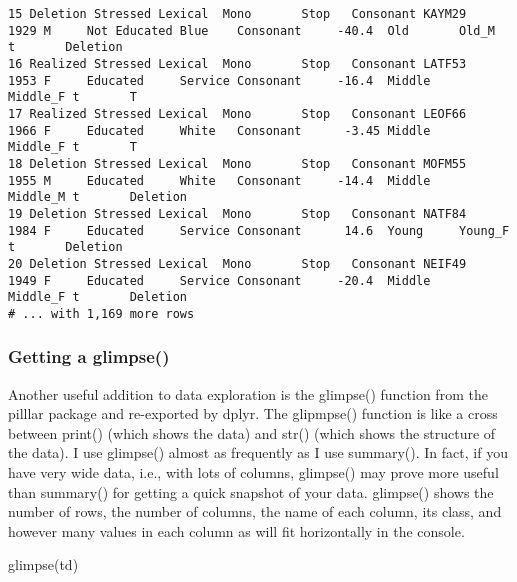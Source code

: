 \documentclass[
  12pt,
  letterpaper]{article}
\newenvironment{Shaded}{\begin{snugshade}}{\end{snugshade}}
\newcommand{\FunctionTok}[1]{\textcolor[rgb]{0.28,0.35,0.67}{#1}}
\newcommand{\NormalTok}[1]{\textcolor[rgb]{0.00,0.23,0.31}{#1}}
\renewcommand\texttt[1]{{\ttfamily\color{BrickRed}#1}}
\begin{document}
\begin{verbatim}
15 Deletion Stressed Lexical  Mono       Stop   Consonant KAYM29   1929 M     Not Educated Blue    Consonant     -40.4  Old       Old_M    t       Deletion    
16 Realized Stressed Lexical  Mono       Stop   Consonant LATF53   1953 F     Educated     Service Consonant     -16.4  Middle    Middle_F t       T           
17 Realized Stressed Lexical  Mono       Stop   Consonant LEOF66   1966 F     Educated     White   Consonant      -3.45 Middle    Middle_F t       T           
18 Deletion Stressed Lexical  Mono       Stop   Consonant MOFM55   1955 M     Educated     White   Consonant     -14.4  Middle    Middle_M t       Deletion    
19 Deletion Stressed Lexical  Mono       Stop   Consonant NATF84   1984 F     Educated     Service Consonant      14.6  Young     Young_F  t       Deletion    
20 Deletion Stressed Lexical  Mono       Stop   Consonant NEIF49   1949 F     Educated     Service Consonant     -20.4  Middle    Middle_F t       Deletion    
# ... with 1,169 more rows
\end{verbatim}

\hypertarget{getting-a-glimpse}{%
\subsubsection{\texorpdfstring{Getting a
\texttt{glimpse()}}{Getting a glimpse()}}\label{getting-a-glimpse}}

Another useful addition to data exploration is the \texttt{glimpse()}
function from the \texttt{pilllar} package and re-exported by
\texttt{dplyr}. The \texttt{glipmpse()} function is like a cross between
\texttt{print()} (which shows the data) and \texttt{str()} (which shows
the structure of the data). I use \texttt{glimpse()} almost as
frequently as I use \texttt{summary()}. In fact, if you have very wide
data, i.e., with lots of columns, \texttt{glimpse()} may prove more
useful than \texttt{summary()} for getting a quick snapshot of your
data. \texttt{glimpse()} shows the number of rows, the number of
columns, the name of each column, its class, and however many values in
each column as will fit horizontally in the console.

\begin{Shaded}
\begin{Highlighting}[]
\FunctionTok{glimpse}\NormalTok{(td)}
\end{Highlighting}
\end{Shaded}
\end{document}
